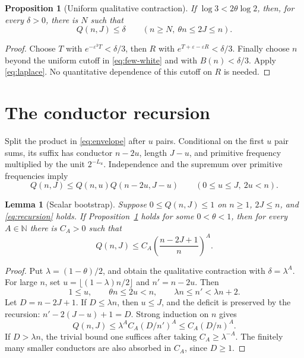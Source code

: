 \documentclass[11pt,a4paper]{article}
\newtheorem{proposition}[theorem]{Proposition}
\newtheorem{lemma}[theorem]{Lemma}
\newcommand{\N}{\mathbb N}
\newcommand{\eps}{\varepsilon}
\begin{document}
\begin{proposition}[Uniform qualitative contraction]\label{prop:qualitative}
If \(\log3<2\theta\log2\), then, for every \(\delta>0\), there is
\(N\) such that
\[
 Q(n,J)\le\delta\qquad
 (n\ge N,\ \theta n\le2J\le n).
\]
\end{proposition}
\begin{proof}
Choose \(T\) with \(e^{-\eps^3T}<\delta/3\), then \(R\) with
\(e^{T+\eps-\eps R}<\delta/3\). Finally choose \(n\) beyond the
uniform cutoff in \eqref{eq:few-white} and with \(B(n)<\delta/3\).
Apply \eqref{eq:laplace}. No quantitative dependence of this cutoff
on \(R\) is needed.
\end{proof}

\section{The conductor recursion}\label{sec:recursion}

Split the product in \eqref{eq:envelope} after \(u\) pairs.
Conditional on the first \(u\) pair sums, its suffix has conductor
\(n-2u\), length \(J-u\), and primitive frequency multiplied by
the unit \(2^{-L_u}\). Independence and the supremum over primitive
frequencies imply
\begin{equation}\label{eq:recursion}
 Q(n,J)\le Q(n,u)Q(n-2u,J-u)
 \qquad(0\le u\le J,\ 2u<n).
\end{equation}

\begin{lemma}[Scalar bootstrap]\label{lem:bootstrap}
Suppose \(0\le Q(n,J)\le1\) on \(n\ge1\), \(2J\le n\), and
\eqref{eq:recursion} holds. If Proposition~\ref{prop:qualitative}
holds for some \(0<\theta<1\), then for every \(A\in\N\) there is
\(C_A>0\) such that
\begin{equation}\label{eq:paired-deficit}
 Q(n,J)\le C_A\left(\frac{n-2J+1}{n}\right)^A.
\end{equation}
\end{lemma}
\begin{proof}
Put \(\lambda=(1-\theta)/2\), and obtain the qualitative contraction
with \(\delta=\lambda^A\). For large \(n\), set
\(u=\lfloor(1-\lambda)n/2\rfloor\) and \(n'=n-2u\).
Then
\[
 1\le u,\qquad \theta n\le2u<n,\qquad
 \lambda n\le n'<\lambda n+2.
\]
Let \(D=n-2J+1\). If \(D\le\lambda n\), then \(u\le J\), and
the deficit is preserved by the recursion:
\(n'-2(J-u)+1=D\).
Strong induction on \(n\) gives
\[
 Q(n,J)\le\lambda^A C_A(D/n')^A
             \le C_A(D/n)^A.
\]
If \(D>\lambda n\), the trivial bound one suffices after taking
\(C_A\ge\lambda^{-A}\). The finitely many smaller conductors are
also absorbed in \(C_A\), since \(D\ge1\).
\end{proof}
\end{document}
